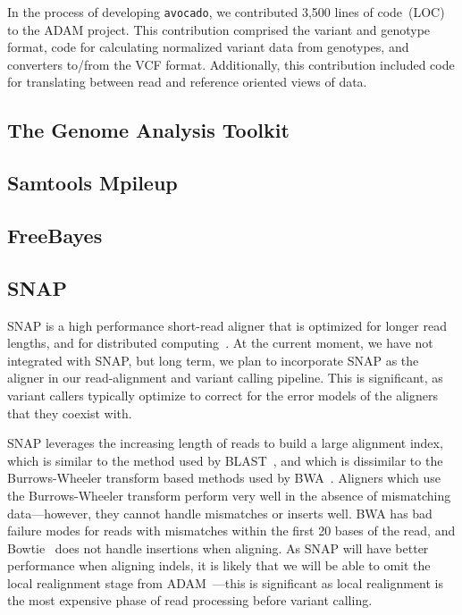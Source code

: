 \documentclass{acm_proc_article-sp}
\begin{document}
In the process of developing \texttt{avocado}, we contributed 3,500 lines of code~(LOC) to the ADAM project. This contribution comprised
the variant and genotype format, code for calculating normalized variant data from genotypes, and converters to/from the VCF format.
Additionally, this contribution included code for translating between read and reference oriented views of data.

\subsection{The Genome Analysis Toolkit}
\label{sec:gatk}


\cite{mckenna10, depristo11}

\subsection{Samtools Mpileup}
\label{sec:samtools}


\cite{li11}

\subsection{FreeBayes}
\label{sec:freebayes}

\cite{garrison12}

\subsection{SNAP}
\label{sec:snap}


SNAP is a high performance short-read aligner that is optimized for longer read lengths, and for distributed computing~\cite{zaharia11}.
At the current moment, we have not integrated with SNAP, but long term, we plan to incorporate SNAP as the aligner in our read-alignment
and variant calling pipeline. This is significant, as variant callers typically optimize to correct for the error models of the aligners that they
coexist with.

SNAP leverages the increasing length of reads to build a large alignment index, which is similar to the method used by
BLAST~\cite{altschul90}, and which is dissimilar to the Burrows-Wheeler transform based methods used by BWA~\cite{li09bwa}. Aligners
which use the Burrows-Wheeler transform perform very well in the absence of mismatching data---however, they cannot handle mismatches
or inserts well. BWA has bad failure modes for reads with mismatches within the first 20 bases of the read, and Bowtie~\cite{langmead09}
does not handle insertions when aligning. As SNAP will have better performance when aligning indels, it is likely that we will be able to
omit the local realignment stage from ADAM~\cite{massie13}---this is significant as local realignment is the most expensive phase of
read processing before variant calling.
\end{document}
